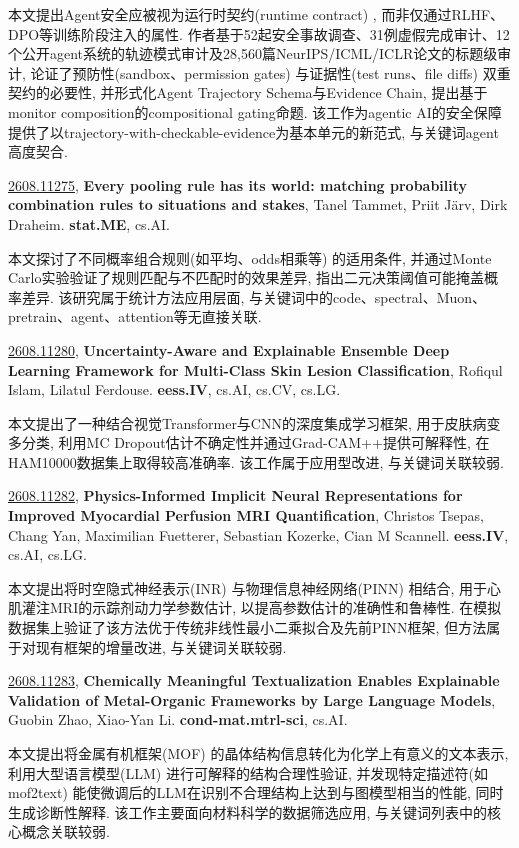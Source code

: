 \documentclass[9pt, a4paper]{article}
\theoremstyle{plain}
\theoremstyle{definition}
\theoremstyle{remark}
\newcommand{\arxivwithtarget}[3]{\hypertarget{#1}{}\href{https://arxiv.org/abs/#1}{#1}, \textbf{\textcolor{arxivblue}{#2}}, #3. }
\begin{document}
本文提出Agent安全应被视为运行时契约(runtime contract) , 而非仅通过RLHF、DPO等训练阶段注入的属性. 作者基于52起安全事故调查、31例虚假完成审计、12个公开agent系统的轨迹模式审计及28,560篇NeurIPS/ICML/ICLR论文的标题级审计, 论证了预防性(sandbox、permission gates) 与证据性(test runs、file diffs) 双重契约的必要性, 并形式化Agent Trajectory Schema与Evidence Chain, 提出基于monitor composition的compositional gating命题. 该工作为agentic AI的安全保障提供了以trajectory-with-checkable-evidence为基本单元的新范式, 与关键词agent高度契合.


\arxivwithtarget{2608.11275}{Every pooling rule has its world: matching probability combination rules to situations and stakes}{Tanel Tammet, Priit Järv, Dirk Draheim}\textbf{stat.ME}, cs.AI.

本文探讨了不同概率组合规则(如平均、odds相乘等) 的适用条件, 并通过Monte Carlo实验验证了规则匹配与不匹配时的效果差异, 指出二元决策阈值可能掩盖概率差异. 该研究属于统计方法应用层面, 与关键词中的code、spectral、Muon、pretrain、agent、attention等无直接关联.


\arxivwithtarget{2608.11280}{Uncertainty-Aware and Explainable Ensemble Deep Learning Framework for Multi-Class Skin Lesion Classification}{Rofiqul Islam, Lilatul Ferdouse}\textbf{eess.IV}, cs.AI, cs.CV, cs.LG.

本文提出了一种结合视觉Transformer与CNN的深度集成学习框架, 用于皮肤病变多分类, 利用MC Dropout估计不确定性并通过Grad-CAM++提供可解释性, 在HAM10000数据集上取得较高准确率. 该工作属于应用型改进, 与关键词关联较弱.


\arxivwithtarget{2608.11282}{Physics-Informed Implicit Neural Representations for Improved Myocardial Perfusion MRI Quantification}{Christos Tsepas, Chang Yan, Maximilian Fuetterer, Sebastian Kozerke, Cian M Scannell}\textbf{eess.IV}, cs.AI, cs.LG.

本文提出将时空隐式神经表示(INR) 与物理信息神经网络(PINN) 相结合, 用于心肌灌注MRI的示踪剂动力学参数估计, 以提高参数估计的准确性和鲁棒性. 在模拟数据集上验证了该方法优于传统非线性最小二乘拟合及先前PINN框架, 但方法属于对现有框架的增量改进, 与关键词关联较弱.


\arxivwithtarget{2608.11283}{Chemically Meaningful Textualization Enables Explainable Validation of Metal-Organic Frameworks by Large Language Models}{Guobin Zhao, Xiao-Yan Li}\textbf{cond-mat.mtrl-sci}, cs.AI.

本文提出将金属有机框架(MOF) 的晶体结构信息转化为化学上有意义的文本表示, 利用大型语言模型(LLM) 进行可解释的结构合理性验证, 并发现特定描述符(如mof2text) 能使微调后的LLM在识别不合理结构上达到与图模型相当的性能, 同时生成诊断性解释. 该工作主要面向材料科学的数据筛选应用, 与关键词列表中的核心概念关联较弱.
\end{document}
